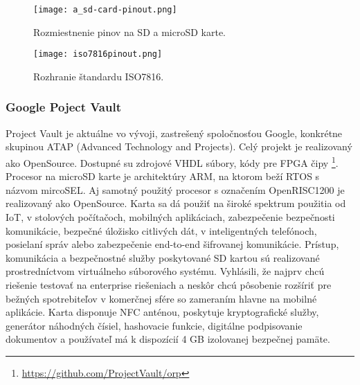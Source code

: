 \documentclass[12pt,a4paper,oneside,openright]{report}
\begin{document}
\begin{figure*}[h]
	\centering
	\texttt{[image: a\_sd-card-pinout.png]}
	\caption{Rozmiestnenie pinov na SD a microSD karte. \cite{usdpinout}}
	\label{f:o_usd}
\end{figure*}

\begin{figure*}[h]
	\centering
	\texttt{[image: iso7816pinout.png]}
	\caption{Rozhranie štandardu ISO7816. \cite{iso7816pinout}}
	\label{f:o_ISO7816}
\end{figure*}


\subsubsection{Google Poject Vault} \label{s_sd_google}
Project Vault je aktuálne vo vývoji, zastrešený spoločnosťou Google, konkrétne skupinou ATAP (Advanced Technology and Projects). Celý projekt je realizovaný ako OpenSource. Dostupné su zdrojové VHDL súbory, kódy pre FPGA čipy \footnote{\url{https://github.com/ProjectVault/orp}}. Procesor na microSD karte je architektúry ARM, na ktorom beží RTOS s názvom mircoSEL. Aj samotný použitý procesor s označením OpenRISC1200 je realizovaný ako OpenSource. Karta sa dá použiť na široké spektrum použitia od IoT, v stolových počítačoch, mobilných aplikáciach, zabezpečenie bezpečnosti komunikácie, bezpečné úložisko citlivých dát, v inteligentných telefónoch, posielaní správ alebo zabezpečenie end-to-end šifrovanej komunikácie.
Prístup, komunikácia a bezpečnostné služby poskytované SD kartou sú realizované prostredníctvom virtuálneho súborového systému.
Vyhlásili, že najprv chcú riešenie testovať na enterprise riešeniach a neskôr chcú pôsobenie rozšíriť pre bežných spotrebiteľov v komerčnej sfére so zameraním hlavne na mobilné aplikácie.
Karta disponuje NFC anténou, poskytuje kryptografické služby, generátor náhodných čísiel, hashovacie funkcie, digitálne podpisovanie dokumentov a používateľ má k dispozícií 4 GB izolovanej bezpečnej pamäte\cite{googlevault}.
\end{document}
